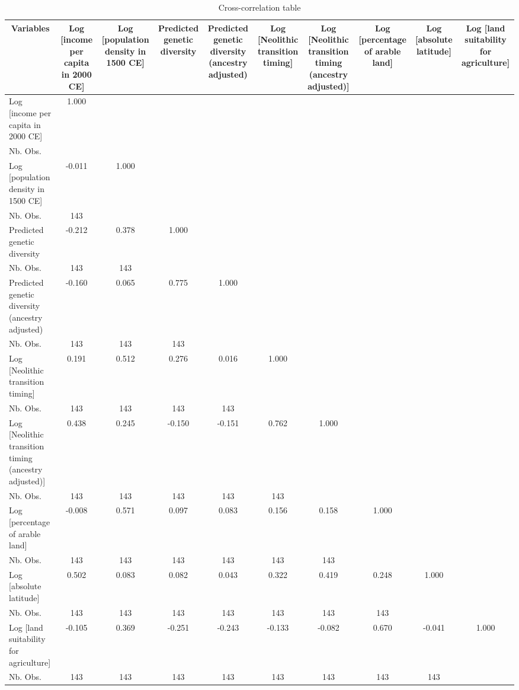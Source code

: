 \begin{table}[htbp]\centering \caption{Cross-correlation table\label{corrtable}}
\begin{tabular}{l  c  c  c  c  c  c  c  c  c }\hline\hline
\multicolumn{1}{c}{Variables} &Log [income per capita in 2000 CE]&Log [population density in 1500 CE]&Predicted genetic diversity&Predicted genetic diversity (ancestry adjusted)&Log [Neolithic transition timing]&Log [Neolithic transition timing (ancestry adjusted)]&Log [percentage of arable land]&Log [absolute latitude]&Log [land suitability for agriculture]\\ \hline
Log [income per capita in 2000 CE]&1.000\\
Nb. Obs. &\\
Log [population density in 1500 CE]&-0.011&1.000\\
Nb. Obs.&  143 &\\
Predicted genetic diversity&-0.212&0.378&1.000\\
Nb. Obs.&  143&  143 &\\
Predicted genetic diversity (ancestry adjusted)&-0.160&0.065&0.775&1.000\\
Nb. Obs.&  143&  143&  143 &\\
Log [Neolithic transition timing]&0.191&0.512&0.276&0.016&1.000\\
Nb. Obs.&  143&  143&  143&  143 &\\
Log [Neolithic transition timing (ancestry adjusted)]&0.438&0.245&-0.150&-0.151&0.762&1.000\\
Nb. Obs.&  143&  143&  143&  143&  143 &\\
Log [percentage of arable land]&-0.008&0.571&0.097&0.083&0.156&0.158&1.000\\
Nb. Obs.&  143&  143&  143&  143&  143&  143 &\\
Log [absolute latitude]&0.502&0.083&0.082&0.043&0.322&0.419&0.248&1.000\\
Nb. Obs.&  143&  143&  143&  143&  143&  143&  143 &\\
Log [land suitability for agriculture]&-0.105&0.369&-0.251&-0.243&-0.133&-0.082&0.670&-0.041&1.000\\
Nb. Obs.&  143&  143&  143&  143&  143&  143&  143&  143\\
\hline \hline 
 \end{tabular}
\end{table}
